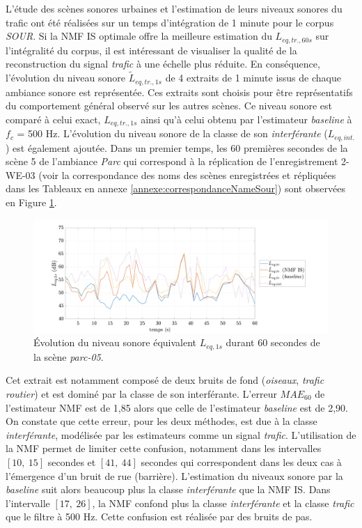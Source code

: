 L'étude des scènes sonores urbaines et l'estimation de leurs niveaux sonores du trafic ont été réalisées sur un temps d'intégration de 1 minute pour le corpus \textit{SOUR}. 
Si la NMF IS optimale offre la meilleure estimation du $L_{eq,tr.,60s}$ sur l'intégralité du corpus, il est intéressant de visualiser la qualité de la reconstruction du signal \textit{trafic} à une échelle plus réduite. En conséquence, l'évolution du niveau sonore $\tilde{L}_{eq,tr.,1s}$ de 4 extraits de 1 minute issus de chaque ambiance sonore est représentée. Ces extraits sont choisis pour être représentatifs du comportement général observé sur les autres scènes. Ce niveau sonore est comparé à celui exact, $L_{eq,tr.,1s}$ ainsi qu'à celui obtenu par l'estimateur \textit{baseline} à $f_c$ = 500 Hz. L'évolution du niveau sonore de la classe de son \textit{interférante} ($L_{eq,int.}$) est également ajoutée. 
Dans un premier temps, les 60 premières secondes de la scène 5 de l'ambiance \textit{Parc} qui correspond à la réplication de l'enregistrement 2-WE-03 (voir la correspondance des noms des scènes enregistrées et répliquées dans les Tableaux en annexe \ref{annexe:correspondanceNameSour}) sont observées en Figure \ref{fig:Lp_parc}.


\begin{figure}[h!]
\centering
\includegraphics[width=.8\linewidth]{./figures/NMF/Lp_park_5.pdf} 
\caption{Évolution du niveau sonore équivalent $L_{eq, 1s}$ durant 60 secondes de la scène \textit{parc-05}.} 
\label{fig:Lp_parc}
\end{figure}

Cet extrait est notamment composé de deux bruits de fond (\textit{oiseaux}, \textit{trafic routier}) et est dominé par la classe de son interférante. 
L'erreur $MAE_{60}$ de l'estimateur NMF est de 1,85 alors que celle de l'estimateur \textit{baseline} est de 2,90. 
On constate que cette erreur, pour les deux méthodes, est due à la classe \textit{interférante}, modélisée par les estimateurs comme un signal \textit{trafic}. L'utilisation de la NMF permet de limiter cette confusion, notamment dans les intervalles $\left[10,~15 \right]$ secondes et $\left[ 41,~44 \right]$ secondes qui correspondent dans les deux cas à l'émergence d'un bruit de rue (barrière). L'estimation du niveaux sonore par la \textit{baseline} suit alors beaucoup plus la classe \textit{interférante} que la NMF IS. Dans l'intervalle $\left[17,~26 \right]$, la NMF confond plus la classe \textit{interférante} et la classe \textit{trafic} que le filtre à 500 Hz. Cette confusion est réalisée par des bruits de pas.  


